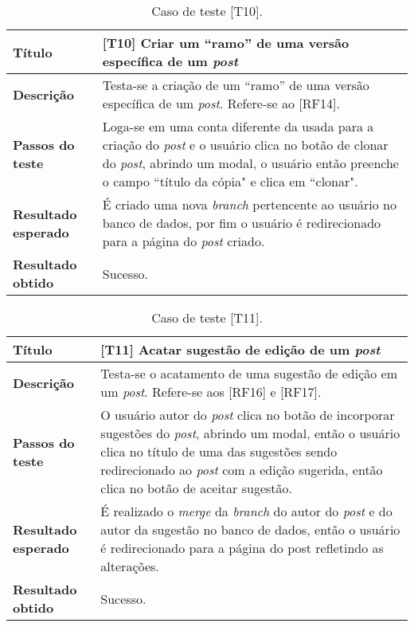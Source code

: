 \begin{table}[hbt!]
    \centering
    \begin{tabularx}{0.9\textwidth}{l|X}
    \hline
    \textbf {Título} & [T10] Criar um “ramo” de uma versão específica de um \textit{post} \\\hline
    \textbf {Descrição} & Testa-se a criação de um “ramo” de uma versão específica de um \textit{post}. Refere-se ao [RF14]. \\ \hline
    \textbf {Passos do teste} & Loga-se em uma conta diferente da usada para a criação do \textit{post} e o usuário clica no botão de clonar do \textit{post}, abrindo um modal, o usuário então preenche o campo “título da cópia" e clica em “clonar".  \\ \hline
    \textbf {Resultado esperado}& É criado uma nova \textit{branch} pertencente ao usuário no banco de dados, por fim o usuário é redirecionado para a página do \textit{post} criado. \\ \hline
    \textbf {Resultado obtido} & Sucesso. \\ \hline
    \end{tabularx}
    \caption{Caso de teste [T10].}
\end{table}

\begin{table}[hbt!]
    \centering
    \begin{tabularx}{0.9\textwidth}{l|X}
    \hline
    \textbf {Título} & [T11] Acatar sugestão de edição de um \textit{post} \\\hline
    \textbf {Descrição} & Testa-se o acatamento de uma sugestão de edição em um \textit{post}. Refere-se aos [RF16] e [RF17]. \\ \hline
    \textbf {Passos do teste} & O usuário autor do \textit{post} clica no botão de incorporar sugestões do \textit{post}, abrindo um modal, então o usuário clica no título de uma das sugestões sendo redirecionado ao \textit{post} com a edição sugerida, então clica no botão de aceitar sugestão. \\ \hline
    \textbf {Resultado esperado} & É realizado o \textit{merge} da \textit{branch} do autor do \textit{post} e do autor da sugestão no banco de dados, então o usuário é redirecionado para a página do post refletindo as alterações. \\ \hline
    \textbf {Resultado obtido} & Sucesso. \\ \hline
    \end{tabularx}
    \caption{Caso de teste [T11].}
\end{table}

